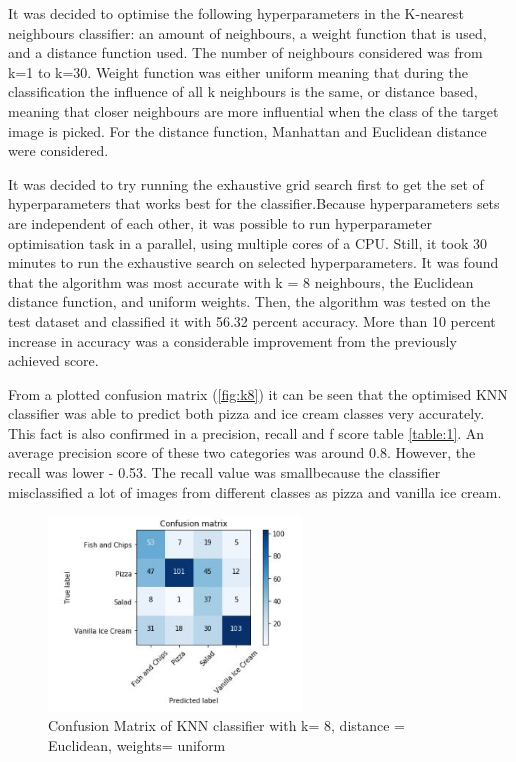  It was decided to optimise the following hyperparameters in the  K-nearest neighbours classifier: an amount of neighbours, a weight function that is used, and a distance function used. The number of neighbours considered was from k=1 to k=30. Weight function was either uniform meaning that during the classification the influence of all k neighbours is the same, or distance based, meaning that closer neighbours are more influential when the class of the target image is picked.  For the distance function, Manhattan and Euclidean distance were considered.


It was decided to try running the exhaustive grid search first to get the set of hyperparameters that works best for the classifier.Because hyperparameters sets are independent of each other, it was possible to run hyperparameter optimisation task in a parallel, using multiple cores of a CPU. Still, it took 30 minutes to run the exhaustive search on selected hyperparameters. It was found that the algorithm was most accurate with k = 8 neighbours, the Euclidean distance function, and uniform weights. Then, the algorithm was tested on the test dataset and classified it with 56.32 percent accuracy. More than 10 percent increase in accuracy was a considerable improvement from the previously achieved score.

From a plotted confusion matrix (\autoref{fig:k8}) it can be seen that the optimised KNN classifier was able to predict both pizza and ice cream classes very accurately. This fact is also confirmed in a precision, recall and f score table \autoref{table:1}. An average precision score of these two categories was around 0.8. However, the recall was lower - 0.53. The recall value was smallbecause the classifier misclassified a lot of images from different classes as pizza and vanilla ice cream.



\begin{figure}[h]
\centering
\includegraphics[width=0.6\textwidth]{Figures/knn.JPG}
\caption{Confusion Matrix of KNN classifier with k= 8, distance = Euclidean, weights= uniform}
\label{fig:k8}
\end{figure}

